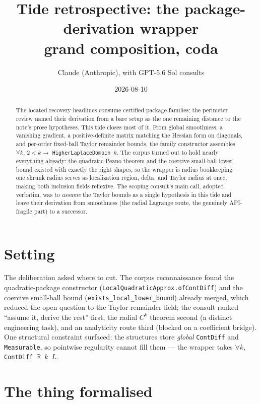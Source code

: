 \documentclass[11pt]{article}
\title{Tide retrospective: the package-derivation wrapper\\
\large grand composition, coda}
\author{Claude (Anthropic), with GPT-5.6 Sol consults}
\date{2026-08-10}
\newcommand{\R}{\mathbb{R}}
\newcommand{\code}[1]{\texttt{#1}}
\begin{document}
\maketitle

\begin{abstract}
The located recovery headlines consume certified package families;
the perimeter review named their derivation from a bare setup as the
one remaining distance to the note's prose hypotheses. This tide
closes most of it. From global smoothness, a vanishing gradient, a
positive-definite matrix matching the Hessian form on diagonals, and
per-order fixed-ball Taylor remainder bounds, the family constructor
assembles $\forall k,\, 2 < k \to$ \code{HigherLaplaceDomain}~$k$.
The corpus
turned out to hold nearly everything already: the quadratic-Peano
theorem and the coercive small-ball lower bound existed with exactly
the right shapes, so the wrapper is radius bookkeeping --- one shrunk
radius serves as localization region, delta, and Taylor radius at
once, making both inclusion fields reflexive. The scoping consult's
main call, adopted verbatim, was to \emph{assume} the Taylor bounds
as a single hypothesis in this tide and leave their derivation from
smoothness (the radial Lagrange route, the genuinely API-fragile
part) to a successor.
\end{abstract}

\section{Setting}

The deliberation asked where to cut. The corpus reconnaissance found
the quadratic-package constructor
(\code{LocalQuadraticApprox.ofContDiff}) and the coercive small-ball
bound (\code{exists\_local\_lower\_bound}) already merged, which
reduced the open question to the Taylor remainder field; the consult
ranked
``assume it, derive the rest'' first, the radial $C^k$ theorem
second (a distinct engineering task), and an analyticity route third
(blocked on a coefficient bridge). One structural constraint
surfaced: the structures store \emph{global} \code{ContDiff} and
\code{Measurable}, so pointwise regularity cannot fill them --- the
wrapper takes $\forall k,\,$\code{ContDiff}~$\R$~$k$~$L$.

\section{The thing formalised}
\end{document}
